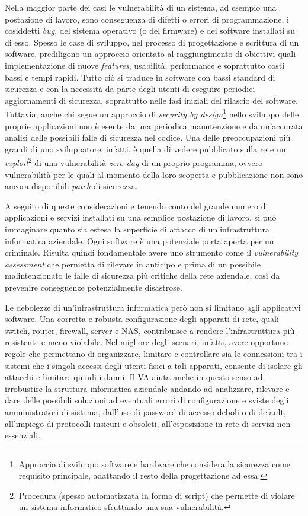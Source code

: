 \documentclass[target=bach,aauheader=]{thud}
\begin{document}
Nella maggior parte dei casi le vulnerabilità di un sistema, ad esempio una postazione di lavoro, sono conseguenza di difetti o errori di programmazione, i cosiddetti \textit{bug}, del sistema operativo (o del firmware) e dei software installati su di esso. Spesso le case di sviluppo, nel processo di progettazione e scrittura di un software, prediligono un approccio orientato al raggiungimento di obiettivi quali implementazione di nuove \textit{features}, usabilità, performance e soprattutto costi bassi e tempi rapidi. Tutto ciò si traduce in software con bassi standard di sicurezza e con la necessità da parte degli utenti di eseguire periodici aggiornamenti di sicurezza, soprattutto nelle fasi iniziali del rilascio del software. Tuttavia, anche chi segue un approccio di \textit{security by design}\footnote{Approccio di sviluppo software e hardware che considera la sicurezza come requisito principale, adattando il resto della progettazione ad essa.} nello sviluppo delle proprie applicazioni non è esente da una periodica manutenzione e da un’accurata analisi delle possibili falle di sicurezza nel codice. Una delle preoccupazioni più grandi di uno sviluppatore, infatti, è quella di vedere pubblicato sulla rete un \textit{exploit}\footnote{Procedura (spesso automatizzata in forma di script) che permette di violare un sistema informatico sfruttando una sua vulnerabilità.} di una vulnerabilità \textit{zero-day} di un proprio programma, ovvero vulnerabilità per le quali al momento della loro scoperta e pubblicazione non sono ancora disponibili \textit{patch} di sicurezza.

A seguito di queste considerazioni e tenendo conto del grande numero di applicazioni e servizi installati su una semplice postazione di lavoro, si può immaginare quanto sia estesa la superficie di attacco di un’infrastruttura informatica aziendale. Ogni software è una potenziale porta aperta per un criminale. Risulta quindi fondamentale avere uno strumento come il \textit{vulnerability assessment} che permetta di rilevare in anticipo e prima di un possibile malintenzionato le falle di sicurezza più critiche della rete aziendale, così da prevenire conseguenze potenzialmente disastrose.

Le debolezze di un’infrastruttura informatica però non si limitano agli applicativi software. Una corretta e robusta configurazione degli apparati di rete, quali switch, router, firewall, server e NAS, contribuisce a rendere l’infrastruttura più resistente e meno violabile. Nel migliore degli scenari, infatti, avere opportune regole che permettano di organizzare, limitare e controllare sia le connessioni tra i sistemi che i singoli accessi degli utenti fisici a tali apparati, consente di isolare gli attacchi e limitare quindi i danni. Il VA aiuta anche in questo senso ad irrobustire la struttura informatica aziendale andando ad analizzare, rilevare e dare delle possibili soluzioni ad eventuali errori di configurazione e sviste degli amministratori di sistema, dall’uso di password di accesso deboli o di default, all’impiego di protocolli insicuri e obsoleti, all’esposizione in rete di servizi non essenziali.
\end{document}
